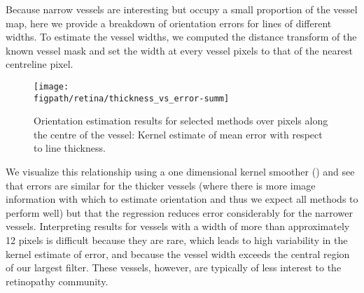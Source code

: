 \label{s:exp_retinogram_orientation_wrt_width}
%
Because narrow vessels are interesting but occupy a small proportion of the vessel map, here we provide a breakdown of orientation errors for lines of different widths. To estimate the vessel widths, we computed the distance transform of the known vessel mask and set the width at every vessel pixels to that of the nearest centreline pixel.

\begin{figure}[t]
\centering
\def\figwidth{0.75\columnwidth}
\texttt{[image: \\figpath/retina/thickness\_vs\_error-summ]} 
%
\caption{Orientation estimation results for selected methods over pixels along the centre of the vessel: Kernel estimate of mean error with respect to line thickness.}
\label{f:retinogram_orientation_wrt_width}
\end{figure}

We visualize this relationship using a one dimensional kernel smoother () and see that errors are similar for the thicker vessels (where there is more image information with which to estimate orientation and thus we expect all methods to perform well) but that the regression reduces error considerably for the narrower vessels. Interpreting results for vessels with a width of more than approximately 12 pixels is difficult because they are rare, which leads to high variability in the kernel estimate of error, and because the vessel width exceeds the central region of our largest filter. These vessels, however, are typically of less interest to the retinopathy community.
